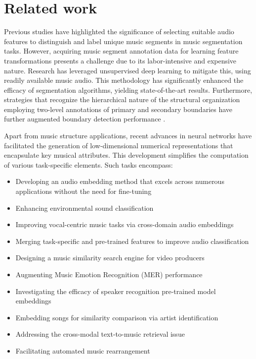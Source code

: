\section{Related work}

Previous studies have highlighted the significance of selecting suitable audio features to distinguish and label unique music segments in music segmentation tasks. However, acquiring music segment annotation data for learning feature transformations presents a challenge due to its labor-intensive and expensive nature. Research has leveraged unsupervised deep learning to mitigate this, using readily available music audio. This methodology has significantly enhanced the efficacy of segmentation algorithms, yielding state-of-the-art results. Furthermore, strategies that recognize the hierarchical nature of the structural organization employing two-level annotations of primary and secondary boundaries have further augmented boundary detection performance \cite{unsupervisedlearndeepfeat, GrillMUSICANNOTATIONS, Hernandez-Olivan2021MusicFeatures, SalamonDeepSegmentation}.

Apart from music structure applications, recent advances in neural networks have facilitated the generation of low-dimensional numerical representations that encapsulate key musical attributes. This development simplifies the computation of various task-specific elements. Such tasks encompass:

\begin{itemize}
\item Developing an audio embedding method that excels across numerous applications without the need for fine-tuning \cite{Turian2022HEAR:Representations}
\item Enhancing environmental sound classification \cite{Kim2020OneStrategies, CramerLOOKEMBEDDINGS}
\item Improving vocal-centric music tasks via cross-domain audio embeddings \cite{Kim2021LearningLoss}
\item Merging task-specific and pre-trained features to improve audio classification \cite{Hung2022Feature-informedClassification}
\item Designing a music similarity search engine for video producers \cite{epidemic}
\item Augmenting Music Emotion Recognition (MER) performance \cite{KohComparisonRecognition}
\item Investigating the efficacy of speaker recognition pre-trained model embeddings \cite{lightweight}
\item Embedding songs for similarity comparison via artist identification \cite{contentmusicsimtriplet2020}
\item Addressing the cross-modal text-to-music retrieval issue \cite{WonEmotionStories}
\item Facilitating automated music rearrangement \cite{Stoller2018IntuitiveTransitions, Plachouras2023MusicSegmentation}
\end{itemize}

